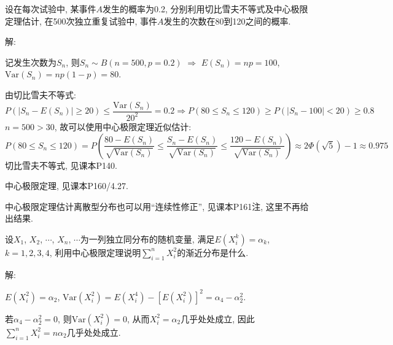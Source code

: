 \documentclass[standard]{ExBook}
\renewenvironment{shaded}{%
  \def\FrameCommand{\fboxsep=\FrameSep \colorbox{shadecolor}}%
  \MakeFramed{\advance\hsize-\width \FrameRestore}%
}{%
  \endMakeFramed
}
\begin{document}
\begin{qitems}
\vspace{2.5cm-5em}

    \begin{bbox}
    \begin{shaded}
        \qitem
设在每次试验中, 某事件$A$发生的概率为0.2, 分别利用切比雪夫不等式及中心极限定理估计, 在500次独立重复试验中, 事件$A$发生的次数在80到120之间的概率.
    \end{shaded}
    \end{bbox}

\vspace{\dimexpr2.5cm-5em\relax}

解: 

记发生次数为$S_n$, 则$S_n\sim B(n=500,p=0.2)$ $\Longrightarrow$ $E(S_n)=np=100$, $\mathrm{Var}(S_n)=np(1-p)=80$.

 由切比雪夫不等式:
$$P(|S_n-E(S_n)|\geq 20)\leq \displaystyle\frac{\mathrm{Var}(S_n)}{20^2}=0.2 \Longrightarrow P(80 \leq S_n \leq 120) \geq P(|S_n-100|<20) \geq 0.8$$
 $n=500>30$, 故可以使用中心极限定理近似估计:
$$\displaystyle P(80\leq S_n\leq 120)=P\left(\frac{80-E(S_n)}{\sqrt{\mathrm{Var}(S_n)}} \leq \frac{S_n-E(S_n)}{\sqrt{\mathrm{Var}(S_n)}} \leq \frac{120-E(S_n)}{\sqrt{\mathrm{Var}(S_n)}}\right) \approx 2\Phi\left(\sqrt{5}\right)-1\approx0.975$$
\textcolor{themeColor}{\selectfont {} 切比雪夫不等式, 见课本P140.}

\textcolor{themeColor}{\selectfont {} 中心极限定理, 见课本P160/4.27.}

\textcolor{themeColor}{\selectfont {} 中心极限定理估计离散型分布也可以用``连续性修正'', 见课本P161注, 这里不再给出结果.}

\vspace{2.5cm-5em}

    \begin{bbox}
    \begin{shaded}
        \qitem
设$X_1$, $X_2$, $\cdots$, $X_n$, $\cdots$为一列独立同分布的随机变量, 满足$E(X_i^k)=\alpha_k$, $k=1,2,3,4$, 利用中心极限定理说明$\displaystyle\sum\limits_{i=1}^{n}X_{i}^2$的渐近分布是什么.
    \end{shaded}
    \end{bbox}

\vspace{\dimexpr2.5cm-5em\relax}

解: 

$E(X_i^2)=\alpha_2$, $\mathrm{Var}(X_i^2)=E(X_i^4)-\left[E(X_i^2)\right]^2=\alpha_4-\alpha_2^2$. 

若$\alpha_4-\alpha_2^2=0$, 则$\mathrm{Var}(X_i^2)=0$, 从而$X_i^2=\alpha_2$几乎处处成立, 因此$\sum\limits_{i=1}^{n}X_i^2=n\alpha_2$几乎处处成立.


\end{qitems}
\end{document}
